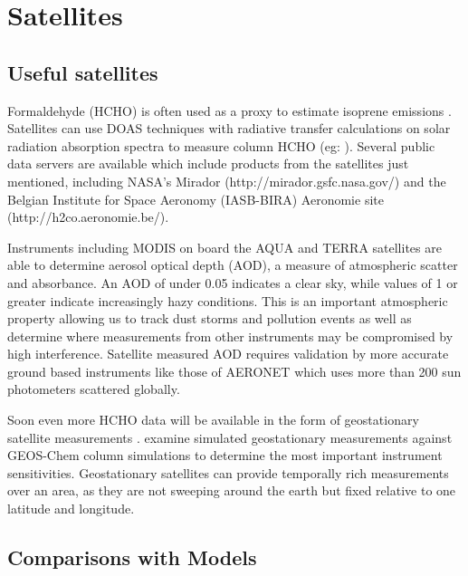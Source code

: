 \section{Satellites}
\label{ch_LitRev:sec:satellites}


  \subsection{Useful satellites}
    
    
    Formaldehyde (HCHO) is often used as a proxy to estimate isoprene emissions \citep{Marais2012,bauwens2013satellite}.
    Satellites can use DOAS techniques with radiative transfer calculations on solar radiation absorption spectra to measure column HCHO (eg: \citet{Leue2001}).
    Several public data servers are available which include products from the satellites just mentioned, including NASA's Mirador (http://mirador.gsfc.nasa.gov/) and the Belgian Institute for Space Aeronomy (IASB-BIRA) Aeronomie site (http://h2co.aeronomie.be/).

    Instruments including MODIS on board the AQUA and TERRA satellites are able to determine aerosol optical depth (AOD), a measure of atmospheric scatter and absorbance. 
    An AOD of under 0.05 indicates a clear sky, while values of 1 or greater indicate increasingly hazy conditions.
    This is an important atmospheric property allowing us to track dust storms and pollution events as well as determine where measurements from other instruments may be compromised by high interference.
    Satellite measured AOD requires validation by more accurate ground based instruments like those of AERONET which uses more than 200 sun photometers scattered globally. 
  
    Soon even more HCHO data will be available in the form of geostationary satellite measurements \citep{Kwon2017}.
    \cite{Kwon2017} examine simulated geostationary measurements against GEOS-Chem column simulations to determine the most important instrument sensitivities.
    Geostationary satellites can provide temporally rich measurements over an area, as they are not sweeping around the earth but fixed relative to one latitude and longitude.
    
  \subsection{Comparisons with Models}
  
